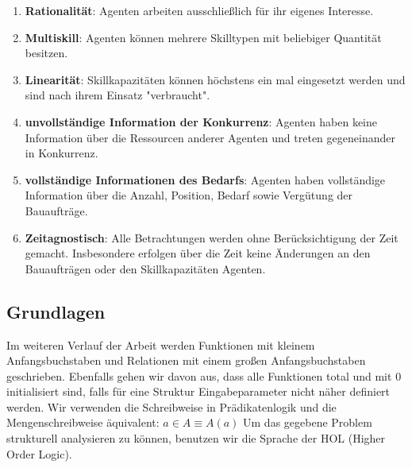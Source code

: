 \begin{enumerate}
  \item \textbf{Rationalität}: Agenten arbeiten ausschließlich für ihr eigenes Interesse.
  \item \textbf{Multiskill}: Agenten können mehrere Skilltypen mit beliebiger Quantität besitzen.
  \item \textbf{Linearität}: Skillkapazitäten können höchstens ein mal eingesetzt werden und sind nach ihrem Einsatz "verbraucht".
  \item \textbf{unvollständige Information der Konkurrenz}: Agenten haben keine Information über die Ressourcen anderer Agenten und treten gegeneinander in Konkurrenz.
  \item \textbf{vollständige Informationen des Bedarfs}: Agenten haben vollständige Information über die Anzahl, Position, Bedarf sowie Vergütung der Bauaufträge.
  \item \textbf{Zeitagnostisch}: Alle Betrachtungen werden ohne Be\-rück\-sich\-ti\-gung der Zeit gemacht. Insbesondere erfolgen über die Zeit keine Änderungen an den Bauaufträgen oder den Skillkapazitäten Agenten.
\end{enumerate}

\subsection{Grundlagen}
\label{basics}
  Im weiteren Verlauf der Arbeit werden Funktionen mit kleinem Anfangsbuchstaben und Relationen mit einem großen Anfangsbuchstaben geschrieben. Ebenfalls gehen wir davon aus, dass alle Funktionen total und mit $0$ initialisiert sind, falls für eine Struktur Eingabeparameter nicht näher definiert werden. Wir verwenden die Schreibweise in Prädikatenlogik und die Mengenschreibweise äquivalent: $a\in A \equiv A(a)$
  Um das gegebene Problem strukturell analysieren zu können, benutzen wir die Sprache der HOL (Higher Order Logic).
